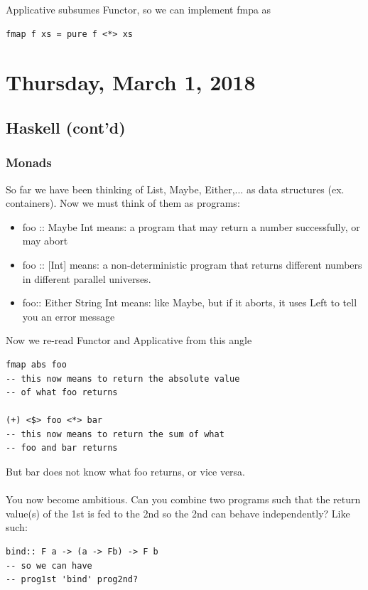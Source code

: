 \documentclass[12pt]{article}
\begin{document}
Applicative subsumes Functor, so we can implement fmpa as

\begin{lstlisting}
fmap f xs = pure f <*> xs
\end{lstlisting}

\newpage

\section{Thursday, March 1, 2018}

\subsection{Haskell (cont'd)}

\subsubsection{Monads}

So far we have been thinking of List, Maybe, Either,... as data structures (ex. containers). Now we must think of them as programs:

\begin{itemize}
	\item{foo :: Maybe Int means: a program that may return a number successfully, or may abort}
	\item{foo :: [Int] means: a non-deterministic program that returns different numbers in different parallel universes.}
	\item{foo:: Either String Int means: like Maybe, but if it aborts, it uses Left to tell you an error message}
\end{itemize}

Now we re-read Functor and Applicative from this angle

\begin{lstlisting}
fmap abs foo
-- this now means to return the absolute value
-- of what foo returns

(+) <$> foo <*> bar
-- this now means to return the sum of what
-- foo and bar returns
\end{lstlisting}

But bar does not know what foo returns, or vice versa.\\
\\
You now become ambitious. Can you combine two programs such that the return value(s) of the 1st is fed to the 2nd so the 2nd can behave independently? Like such:

\begin{lstlisting}
bind:: F a -> (a -> Fb) -> F b
-- so we can have
-- prog1st 'bind' prog2nd?
\end{lstlisting}
\end{document}

